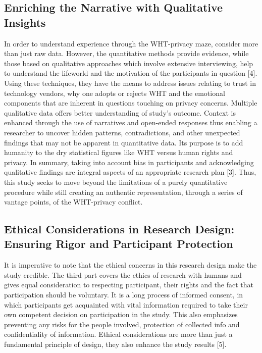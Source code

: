 \documentclass[11pt]{article}
\begin{document}
\subsection{Enriching the Narrative with Qualitative Insights}

In order to understand experience through the WHT-privacy maze, consider more than just raw data. However, the quantitative methods provide evidence, while those based on qualitative approaches which involve extensive interviewing, help to understand the lifeworld and the motivation of the participants in question [4]. Using these techniques, they have the means to address issues relating to trust in technology vendors, why one adopts or rejects WHT and the emotional components that are inherent in questions touching on privacy concerns. Multiple qualitative data offers better understanding of study’s outcome. Context is enhanced through the use of narratives and open-ended responses thus enabling a researcher to uncover hidden patterns, contradictions, and other unexpected findings that may not be apparent in quantitative data. Its purpose is to add humanity to the dry statistical figures like WHT versus human rights and privacy. In summary, taking into account bias in participants and acknowledging qualitative findings are integral aspects of an appropriate research plan [3]. Thus, this study seeks to move beyond the limitations of a purely quantitative procedure while still creating an authentic representation, through a series of vantage points, of the WHT-privacy conflict.

\subsection{Ethical Considerations in Research Design: Ensuring Rigor and Participant Protection}

It is imperative to note that the ethical concerns in this research design make the study credible. The third part covers the ethics of research with humans and gives equal consideration to respecting participant, their rights and the fact that participation should be voluntary. It is a long process of informed consent, in which participants get acquainted with vital information required to take their own competent decision on participation in the study. This also emphasizes preventing any risks for the people involved, protection of collected info and confidentiality of information. Ethical considerations are more than just a fundamental principle of design, they also enhance the study results [5].
\end{document}
